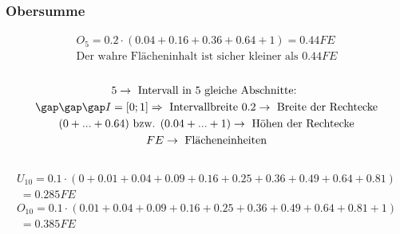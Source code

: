 \subsubsection{Obersumme}
\begin{gather*}
  O_5 = 0.2 \cdot (0.04 + 0.16 + 0.36 + 0.64 + 1) = 0.44FE \\
  \text{Der wahre Flächeninhalt ist sicher kleiner als } 0.44FE
\end{gather*} \\
\begin{gather*}
  5 \rightarrow \text{ Intervall in $5$ gleiche Abschnitte: } \\
  \gap\gap\gap I = \left[0; 1\right] \Rightarrow \text{ Intervallbreite } 0.2 \rightarrow \text{ Breite der Rechtecke} \\
  (0 + ... + 0.64) \text{ bzw. } (0.04 + ... + 1) \rightarrow \text{ Höhen der Rechtecke} \\
  FE \rightarrow \text{ Flächeneinheiten}
\end{gather*} \\
\begin{gather*}
  U_{10} = 0.1 \cdot (0 + 0.01 + 0.04 + 0.09 + 0.16 + 0.25 + 0.36 + 0.49 + 0.64 + 0.81) \\
  \;= 0.285FE \\
  O_{10} = 0.1 \cdot (0.01 + 0.04 + 0.09 + 0.16 + 0.25 + 0.36 + 0.49 + 0.64 + 0.81 + 1) \\
  \;= 0.385FE
\end{gather*}
\newpage
